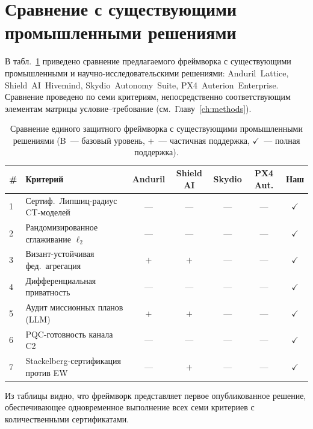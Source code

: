 \section{Сравнение с существующими промышленными решениями}
\label{sec:uav_comparison}

В табл.~\ref{tab:uav_industry_cmp} приведено сравнение предлагаемого
фреймворка с существующими промышленными и научно-исследовательскими
решениями: \mbox{Anduril~Lattice}, \mbox{Shield~AI~Hivemind},
\mbox{Skydio~Autonomy~Suite}, \mbox{PX4~Auterion~Enterprise}. Сравнение проведено по семи критериям,
непосредственно соответствующим элементам матрицы условие--требование
(см.~Главу~\ref{ch:methods}).

\begin{table}[H]
\centering
\caption{Сравнение единого защитного фреймворка с существующими
промышленными решениями (B~--- базовый уровень, $+$~--- частичная
поддержка, $\checkmark$~--- полная поддержка).}
\label{tab:uav_industry_cmp}
\small
\setlength{\tabcolsep}{3pt}
\renewcommand{\arraystretch}{1.15}
\begin{tabularx}{\linewidth}{@{}lXccccc@{}}
\toprule
\# & \textbf{Критерий}
   & \textbf{Anduril} & \textbf{Shield AI} & \textbf{Skydio} & \textbf{PX4 Aut.} & \textbf{Наш}\\
\midrule
1 & Сертиф.\ Липшиц-радиус CT-моделей           & ---   & ---   & ---   & ---   & $\checkmark$\\
2 & Рандомизированное сглаживание $\ell_2$       & ---   & ---   & ---   & ---   & $\checkmark$\\
3 & Визант-устойчивая фед.\ агрегация            & $+$   & $+$   & ---   & ---   & $\checkmark$\\
4 & Дифференциальная приватность                 & ---   & ---   & ---   & ---   & $\checkmark$\\
5 & Аудит миссионных планов (LLM)                & $+$   & $+$   & ---   & ---   & $\checkmark$\\
6 & PQC-готовность канала C2                     & ---   & ---   & ---   & ---   & $\checkmark$\\
7 & Stackelberg-сертификация против EW           & ---   & $+$   & ---   & ---   & $\checkmark$\\
\bottomrule
\end{tabularx}
\end{table}

Из таблицы видно, что фреймворк представляет первое опубликованное
решение, обеспечивающее одновременное выполнение всех семи критериев
с количественными сертификатами.



